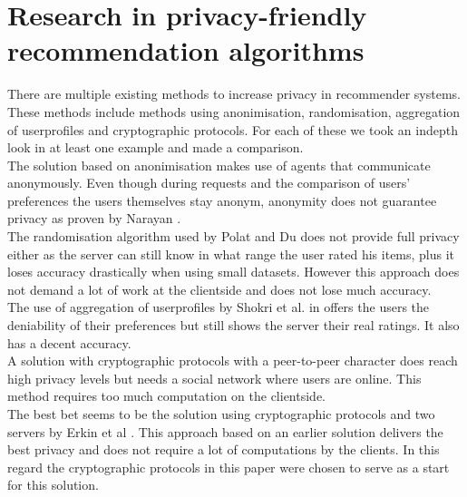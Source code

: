 \documentclass[twocolumn]{phdsymp} %
\begin{document}
\section{Research in privacy-friendly recommendation algorithms}
There are multiple existing methods to increase privacy in recommender systems. These methods include methods using anonimisation, randomisation, aggregation of userprofiles and cryptographic protocols. For each of these we took an indepth look in at least one example and made a comparison.\\The solution based on anonimisation \cite{anonimisatie} makes use of agents that communicate anonymously. Even though during requests and the comparison of users' preferences the users themselves stay anonym, anonymity does not guarantee privacy as proven by Narayan \cite{anon}.\\The randomisation algorithm used by Polat and Du \cite{rand} does not provide full privacy either as the server can still know in what range the user rated his items, plus it loses accuracy drastically when using small datasets. However this approach does not demand a lot of work at the clientside and does not lose much accuracy.\\  The use of aggregation of userprofiles by Shokri et al. in \cite{agg} offers the users the deniability of their preferences but still shows the server their real ratings. It also has a decent accuracy.\\ A solution with cryptographic protocols with a peer-to-peer character \cite{social} does reach high privacy levels but needs a social network where users are online. This method requires too much computation on the clientside.\\ The best bet seems to be the solution using cryptographic protocols and two servers by Erkin et al \cite{dyn}. This approach based on an earlier solution \cite{erkin} delivers the best privacy and does not require a lot of computations by the clients. In this regard the cryptographic protocols in this paper were chosen to serve as a start for this solution.
\end{document}
